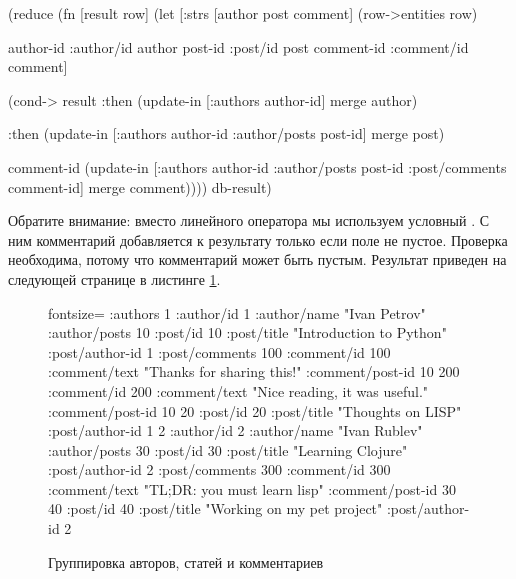 \begin{english}
  \begin{clojure}
(reduce
 (fn [result row]
   (let [{:strs [author post comment]}
         (row->entities row)

         {author-id :author/id}   author
         {post-id :post/id}       post
         {comment-id :comment/id} comment]

     (cond-> result
       :then
       (update-in [:authors
                   author-id] merge author)

       :then
       (update-in [:authors
                   author-id
                   :author/posts
                   post-id] merge post)

       comment-id
       (update-in [:authors
                   author-id
                   :author/posts
                   post-id
                   :post/comments
                   comment-id] merge comment))))
 {}
 db-result)
  \end{clojure}
\end{english}


Обратите внимание: вместо линейного оператора \code{\arr} мы используем условный . С ним комментарий добавляется к результату только если поле  не пустое. Проверка необходима, потому что комментарий может быть пустым. Результат приведен на следующей странице в листинге \ref{lis:nested-result}.

\begin{figure}[ht!]

\begin{english}
  \begin{clojure*}{fontsize=\small}
{:authors
 {1 {:author/id 1
     :author/name "Ivan Petrov"
     :author/posts
       {10 {:post/id 10
            :post/title "Introduction to Python"
            :post/author-id 1
            :post/comments
              {100 {:comment/id 100
                    :comment/text "Thanks for sharing this!"
                    :comment/post-id 10}
               200 {:comment/id 200
                    :comment/text "Nice reading, it was useful."
                    :comment/post-id 10}}}
        20 {:post/id 20
            :post/title "Thoughts on LISP"
            :post/author-id 1}}}
  2 {:author/id 2
     :author/name "Ivan Rublev"
     :author/posts
       {30 {:post/id 30
            :post/title "Learning Clojure"
            :post/author-id 2
            :post/comments
              {300 {:comment/id 300
                    :comment/text "TL;DR: you must learn lisp"
                    :comment/post-id 30}}}
        40 {:post/id 40
            :post/title "Working on my pet project"
            :post/author-id 2}}}}}
  \end{clojure*}
\end{english}

\captionsetup{labelformat=lis}
\caption{Группировка авторов, статей и комментариев}

\label{lis:nested-result}

\end{figure}

